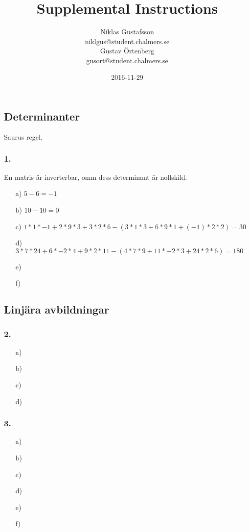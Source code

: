 \documentclass{article}
\title{Supplemental Instructions}
\author{Niklas Gustafsson \\ 
		\small{niklgus@student.chalmers.se} \\
		Gustav Örtenberg \\ 
		\small{gusort@student.chalmers.se}
}
\date{
      2016-11-29
     }
\begin{document}
\maketitle

\subsection*{Determinanter}
Saurus regel.
\subsubsection*{1.}
En matris är inverterbar, omm dess determinant är nollskild.
\begin{itemize}
	\item[a) ] $5-6=-1$
	\item[b) ] $10-10=0$
	\item[c) ] $1*1*-1+2*9*3+3*2*6-(3*1*3+6*9*1+(-1)*2*2)=30$
	\item[d) ] $3*7*24+6*-2*4+9*2*11-(4*7*9+11*-2*3+24*2*6)=180$
	\item[e) ] $  $
	\item[f) ] $  $
\end{itemize}

\subsection*{Linjära avbildningar}
\subsubsection*{2.}
\begin{itemize}
	\item[a) ] 
	\item[b) ] 
	\item[c) ] 
	\item[d) ] 
\end{itemize}

\subsubsection*{3.}
\begin{itemize} 
	\item[a) ] 
	\item[b) ]  
	\item[c) ]  
	\item[d) ] 
	\item[e) ] 
	\item[f) ] 
\end{itemize}
\end{document}
